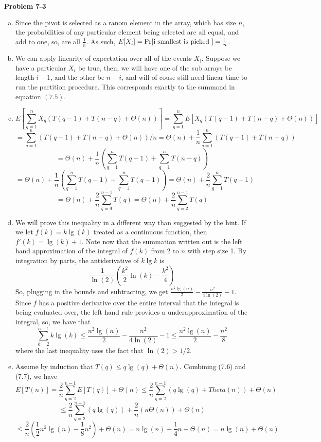 \documentclass{article}
\begin{document}
\noindent\textbf{Problem 7-3}\\
\begin{enumerate}[a.]
\item
Since the pivot is selected as a ranom element in the array, which has size $n$, the probabilities of any particular element being selected are all equal, and add to one, so, are all $\frac{1}{n}$. As such, $E[X_i] = \Pr[\hbox{i smallest is picked }] = \frac{1}{n}$.

\item
We can apply linearity of expectation over all of the events $X_i$. Suppose we have a particular $X_i$ be true, then, we will have one of the sub arrays be length $i-1$, and the other be $n-i$, and will of couse still need linear time to run the partition procedure. This corresponds exactly to the summand in equation $(7.5)$.

\item
\[
E\left[\sum_{q=1}^{n}X_q(T(q-1) + T(n-q) + \Theta(n))\right] = \sum_{q=1}^{n} E\left[X_q(T(q-1) + T(n-q) + \Theta(n))\right] \]\[= \sum_{q=1}^{n}(T(q-1) + T(n-q) + \Theta(n))/n = \Theta(n) +  \frac{1}{n} \sum_{q=1}^{n}(T(q-1) + T(n-q) ) \]\[= \Theta(n) + \frac{1}{n} \left(  \sum_{q=1}^{n}T(q-1) +  \sum_{q=1}^{n}T(n-q)\right) \]\[= \Theta(n) + \frac{1}{n} \left(  \sum_{q=1}^{n}T(q-1) +  \sum_{q=1}^{n}T(q-1)\right) = \Theta(n) + \frac{2}{n} \sum_{q=1}^{n}T(q-1) \]\[= \Theta(n) + \frac{2}{n} \sum_{q=0}^{n-1}T(q) = \Theta(n) + \frac{2}{n} \sum_{q=2}^{n-1}T(q)\]

\item

We will prove this inequality in a different way than suggested by the hint. If we let $f(k) = k\lg(k)$ treated as a continuous function, then $f'(k) = \lg(k) + 1$. Note now that the summation written out is the left hand approximation of the integral of $f(k)$ from 2 to $n$ with step size 1. By integration by parts, the antiderivative of $k\lg k$ is 
\[
\frac{1}{\ln(2)}\left(\frac{k^2}{2}\ln(k) - \frac{k^2}{4} \right)
\]
So, plugging in the bounds and subtracting, we get $\frac{n^2 \lg(n)}{2} - \frac{n^2}{4\ln(2)} - 1$. Since $f$ has a positive derivative over the entire interval that the integral is being evaluated over, the left hand rule provides a underapproximation of the integral, so, we have that 
\[
\sum_{k=2}^{n-1} k\lg(k) \le \frac{n^2 \lg(n)}{2} - \frac{n^2}{4\ln(2)} - 1 \le \frac{n^2 \lg(n)}{2} - \frac{n^2}{8} 
\]
where the last inequality uses the fact that $\ln(2)>1/2$.

\item
Assume by induction that $T(q) \le q\lg(q)+\Theta(n)$. Combining (7.6) and (7.7), we have
\[
E[T(n)] = \frac{2}{n} \sum_{q=2}^{n-1} E[T(q)] + \Theta(n) \le \frac{2}{n} \sum_{q=2}^{n-1} (q\lg(q) + Theta(n)) + \Theta(n) \]\[\le \frac{2}{n} \sum_{q=2}^{n-1} (q\lg(q)) + \frac{2}{n}(n\Theta(n)) + \Theta(n)\]\[   \le \frac{2}{n} (\frac{1}{2} n^2 \lg(n) -\frac{1}{8} n^2) + \Theta(n) = n\lg(n) - \frac{1}{4} n+ \Theta(n) = n\lg(n) +\Theta(n)
\]

\end{enumerate}
\end{document}
